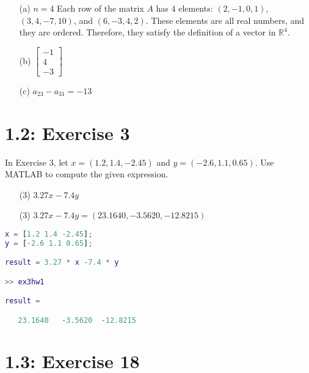 \documentclass{report}
\begin{document}
\sol 

\begin{enumerate}
\item[(a)]     
$ \boxed{n = 4}$
Each row of the matrix $A$ has 4 elements: $(2, -1, 0, 1)$, $(3, 4, -7, 10)$, and $(6, -3, 4, 2)$. These elements are all real numbers, and they are ordered. Therefore, they satisfy the definition of a vector in $\mathbb{R}^4$.
\item[(b)]     
$
 \boxed{
    \begin{bmatrix}
        -1 \\
        4 \\
        -3
    \end{bmatrix}
}
 $
 
\item[(c)] 
   $
    a_{23}-a_{31} =  \boxed{-13}
   $
\end{enumerate}

\section*{1.2: Exercise 3} 

In Exercise 3, let 
$x=(1.2,1.4,-2.45)$ and $y=(-2.6,1.1,0.65)$. Use MATLAB to compute the 
given expression.

\begin{enumerate}
    \item[(3) ]$3.27x-7.4y$
    
\end{enumerate}

\sol 

\begin{enumerate}
\item[(3)]     
$3.27x - 7.4y =  \boxed{(23.1640, -3.5620, -12.8215)}$
\end{enumerate}

\begin{lstlisting}[language=Matlab, caption={MATLAB code}, xleftmargin=\parindent]
x = [1.2 1.4 -2.45];
y = [-2.6 1.1 0.65];

result = 3.27 * x -7.4 * y 

>> ex3hw1

result =

   23.1640   -3.5620  -12.8215

\end{lstlisting}


\section*{1.3: Exercise 18} 
\end{document}

